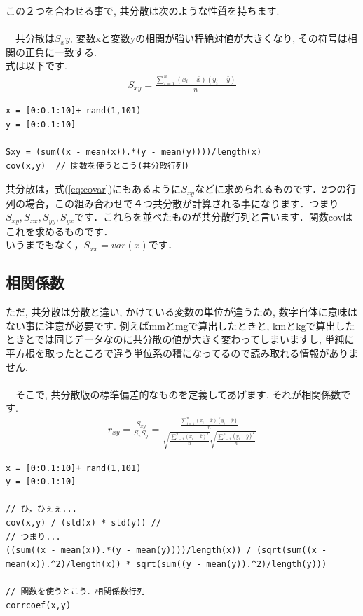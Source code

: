 \documentclass[11pt,a4paper,uplatex]{ujreport}
\begin{document}
この２つを合わせる事で, 共分散は次のような性質を持ちます.\\
\\
　共分散は$S_xy$, 変数xと変数yの相関が強い程絶対値が大きくなり, その符号は相関の正負に一致する.
\\
式は以下です.\\
\begin{eqnarray}
\label{eq:covar}
S_{xy} = \frac{\sum_{i=1}^{n} (x_i - \bar{x})(y_i - \bar{y})}{n}
\end{eqnarray}

\begin{lstlisting}[caption=共分散のコード,label=sc:scatter keepspaces=true，]
x = [0:0.1:10]+ rand(1,101)
y = [0:0.1:10]

Sxy = (sum((x - mean(x)).*(y - mean(y))))/length(x)
cov(x,y)  // 関数を使うとこう(共分散行列)
\end{lstlisting}
共分散は，式(\ref{eq:covar})にもあるように$S_{xy}$などに求められるものです．2つの行列の場合，この組み合わせで４つ共分散が計算される事になります．つまり$S_{xy}, S_{xx}, S_{yy}, S_{yx}$です．これらを並べたものが共分散行列と言います．関数covはこれを求めるものです．\\
いうまでもなく，$S_{xx} = var(x)$です．

\subsection{相関係数}
ただ, 共分散は分散と違い, かけている変数の単位が違うため, 数字自体に意味はない事に注意が必要です. 例えばmmとmgで算出したときと, kmとkgで算出したときとでは同じデータなのに共分散の値が大きく変わってしまいますし, 単純に平方根を取ったところで違う単位系の積になってるので読み取れる情報がありません.\\
\\
　そこで, 共分散版の標準偏差的なものを定義してあげます. それが相関係数です.\\

\begin{eqnarray}
\label{eq:correlation}
r_{xy} = \frac{S_{xy}}{S_x S_y} = \frac{\frac{\sum_{i=1}^{n} (x_i - \bar{x})(y_i - \bar{y})}{n}}{\sqrt{\frac{\sum_{i=1}^{n} (x_i - \bar{x})^2}{n}} \sqrt{\frac{\sum_{i=1}^{n} (y_i - \bar{y})^2}{n}}}
\end{eqnarray}

\begin{lstlisting}[caption=単回帰のコード,label=sc:scatter]
x = [0:0.1:10]+ rand(1,101)
y = [0:0.1:10]

// ひ，ひぇぇ...
cov(x,y) / (std(x) * std(y)) // 
// つまり...
((sum((x - mean(x)).*(y - mean(y))))/length(x)) / (sqrt(sum((x - mean(x)).^2)/length(x)) * sqrt(sum((y - mean(y)).^2)/length(y)))

// 関数を使うとこう．相関係数行列
corrcoef(x,y)
\end{lstlisting}
\end{document}
